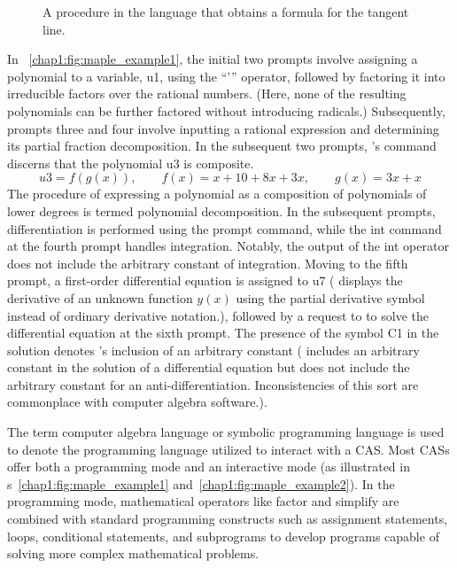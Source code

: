 \begin{figure}
  \centering
  \caption{A procedure in the \Maple{} language that obtains a formula for the tangent line.}
  \label{chap1:fig:maple_example3}
\end{figure}

In \figurename~\ref{chap1:fig:maple_example1}, the initial two prompts involve assigning a polynomial to a variable, u1, using the ``'\code{:=}'' operator, followed by factoring it into irreducible factors over the rational numbers. (Here, none of the resulting polynomials can be further factored without introducing radicals.) Subsequently, prompts three and four involve inputting a rational expression and determining its partial fraction decomposition. In the subsequent two prompts, \Maple{}'s  command discerns that the polynomial u3 is composite.
%
\begin{equation*}
  u3 = f(g(x)), \qquad f(x) = x + 10 + 8x + 3x, \qquad g(x) = 3x + x
\end{equation*}
%
The procedure of expressing a polynomial as a composition of polynomials of lower degrees is termed polynomial decomposition. In the subsequent prompts, differentiation is performed using the prompt command, while the int command at the fourth prompt handles integration. Notably, the output of the int operator does not include the arbitrary constant of integration. Moving to the fifth prompt, a first-order differential equation is assigned to u7 (\Maple{} displays the derivative of an unknown function $y(x)$ using the partial derivative symbol instead of ordinary derivative notation.), followed by a request to \Maple{} to solve the differential equation at the sixth prompt. The presence of the symbol C1 in the solution denotes \Maple{}'s inclusion of an arbitrary constant (\Maple{} includes an arbitrary constant in the solution of a differential equation but does not include the arbitrary constant for an anti-differentiation. Inconsistencies of this sort are commonplace with computer algebra software.).

The term computer algebra language or symbolic programming language is used to denote the programming language utilized to interact with a \ac{CAS}. Most \acp{CAS} offer both a programming mode and an interactive mode (as illustrated in \figurename{}s~\ref{chap1:fig:maple_example1} and~\ref{chap1:fig:maple_example2}). In the programming mode, mathematical operators like factor and simplify are combined with standard programming constructs such as assignment statements, loops, conditional statements, and subprograms to develop programs capable of solving more complex mathematical problems.

